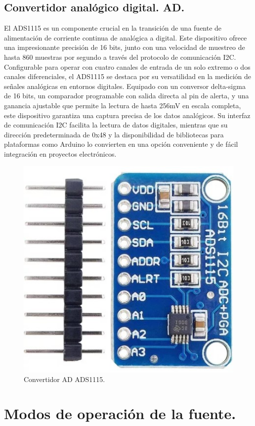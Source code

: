 \subsection{Convertidor analógico digital. AD.}
El ADS1115 es un componente crucial en la transición de una fuente de alimentación de corriente continua de analógica a digital. Este dispositivo ofrece una impresionante precisión de 16 bits, junto con una velocidad de muestreo de hasta 860 muestras por segundo a través del protocolo de comunicación I2C. Configurable para operar con cuatro canales de entrada de un solo extremo o dos canales diferenciales, el ADS1115 se destaca por su versatilidad en la medición de señales analógicas en entornos digitales. 
Equipado con un conversor delta-sigma de 16 bits, un comparador programable con salida directa al pin de alerta, y una ganancia ajustable que permite la lectura de hasta 256mV en escala completa, este dispositivo garantiza una captura precisa de los datos analógicos. Su interfaz de comunicación I2C facilita la lectura de datos digitales, mientras que su dirección predeterminada de 0x48 y la disponibilidad de bibliotecas para plataformas como Arduino lo convierten en una opción conveniente y de fácil integración en proyectos electrónicos.
\begin{figure}[H]
    \centering
    \includegraphics[scale=0.3]{./imagenes/ads1115.jpg}
    \caption{Convertidor AD ADS1115.}
    \label{F:ADC}
\end{figure}

\section{Modos de operación de la fuente.}

